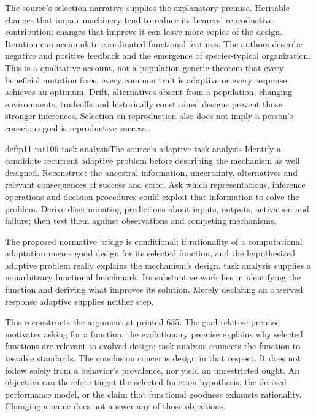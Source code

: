 The source's selection narrative supplies the explanatory premise.
Heritable changes that impair machinery tend to reduce its bearers'
reproductive contribution; changes that improve it can leave more copies
of the design. Iteration can accumulate coordinated functional features.
The authors describe negative and positive feedback and the emergence
of species-typical organization. This is a qualitative account, not a
population-genetic theorem that every beneficial mutation fixes, every
common trait is adaptive or every response achieves an optimum.
Drift, alternatives absent from a population, changing environments,
tradeoffs and historically constrained designs prevent those stronger
inferences. Selection on reproduction also does not imply a person's
conscious goal is reproductive success
\cite[pp.~634--635]{CosmidesTooby2021Adaptationism}.

\begin{hbmethod}{def:p11-rat106-task-analysis}{The source's adaptive task analysis}
Identify a candidate recurrent adaptive problem before describing the
mechanism as well designed. Reconstruct the ancestral information,
uncertainty, alternatives and relevant consequences of success and error.
Ask which representations, inference operations and decision procedures
could exploit that information to solve the problem. Derive discriminating
predictions about inputs, outputs, activation and failure; then test them
against observations and competing mechanisms.

The proposed normative bridge is conditional: if rationality of a
computational adaptation means good design for its selected function,
and the hypothesized adaptive problem really explains the mechanism's
design, task analysis supplies a nonarbitrary functional benchmark.
Its substantive work lies in identifying the function and deriving
what improves its solution. Merely declaring an observed response
adaptive supplies neither step.
\end{hbmethod}

This reconstructs the argument at printed 635. The goal-relative premise
motivates asking for a function; the evolutionary premise explains why
selected functions are relevant to evolved design; task analysis connects
the function to testable standards. The conclusion concerns design in
that respect. It does not follow solely from a behavior's prevalence,
nor yield an unrestricted ought. An objection can therefore target the
selected-function hypothesis, the derived performance model, or the
claim that functional goodness exhausts rationality. Changing a name
does not answer any of those objections.

